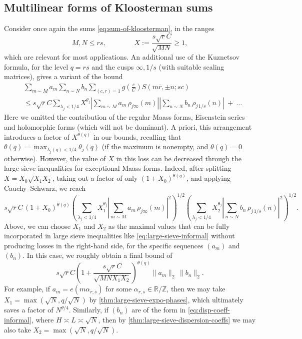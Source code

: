 \documentclass[reqno,11pt]{amsart}
\theoremstyle{remark}
\numberwithin{equation}{section}
\newcommand{\Z}{\mathbb{Z}}
\newcommand{\R}{\mathbb{R}}
\renewcommand{\bar}{\overline}
\begin{document}
\subsection{Multilinear forms of Kloosterman sums} \label{subsec:overview-kloosterman}
Consider once again the sums \cref{eq:sum-of-kloosterman}, in the ranges
\[
    M, N \le rs, \qquad\qquad 
    X := \frac{s\sqrt{r} C}{\sqrt{MN}} \ge 1,
\] 
which are relevant for most applications.
An additional use of the Kuznetsov formula, for the level $q = rs$ and the cusps $\infty, 1/s$ (with suitable scaling matrices), gives a variant of the bound
\[
\begin{aligned}
    &\sum_{m \sim M} a_m \sum_{n \sim N} b_n \sum_{(c, r) = 1} g\left(\frac{c}{C}\right) S(m\bar{r}, \pm n; sc)
    \\ 
    &\le 
    s\sqrt{r}C \sum_{\lambda_j < 1/4} X^{\theta_j} \left\vert \sum_{m \sim M} a_m\, \rho_{j\infty}(m) \right\vert \left\vert \sum_{n \sim N} b_n\, \rho_{j\, 1/s}(n)\right\vert \ + \ \ldots
\end{aligned}
\]
Here we omitted the contribution of the regular Maass forms, Eisenstein series and holomorphic forms (which will not be dominant).
A priori, this arrangement introduces a factor of $X^{\theta(q)}$ in our bounds, recalling that $\theta(q) = \max_{\lambda_j(q) < 1/4} \theta_j(q)$ (if the maximum is nonempty, and $\theta(q) = 0$ otherwise). However, the value of $X$ in this loss can be decreased through the large sieve inequalities for exceptional Maass forms. Indeed, after splitting $X = X_0 \sqrt{X_1 X_2}$, taking out a factor of only $(1 + X_0)^{\theta(q)}$, and applying Cauchy--Schwarz, we reach
\[
    s\sqrt{r}C\, (1 + X_0)^{\theta(q)} 
    \left(\sum_{\lambda_j < 1/4} X_1^{\theta_j} \left\vert \sum_{m \sim M} a_m\, \rho_{j\infty}(m) \right\vert^2 \right)^{1/2}
    \left(\sum_{\lambda_j < 1/4} X_2^{\theta_j} \left\vert \sum_{n \sim N} b_n\, \rho_{j\, 1/s}(n) \right\vert^2 \right)^{1/2}.
\]
Above, we can choose $X_1$ and $X_2$ as the maximal values that can be fully incorporated in large sieve inequalities like \cref{eq:large-sieve-informal} without producing losses in the right-hand side, for the specific sequences $(a_m)$ and $(b_n)$. In this case, we roughly obtain a final bound of
\[
    s\sqrt{r} C \left(1 + \frac{s\sqrt{r}C}{\sqrt{MN X_1 X_2}}\right)^{\theta(q)} 
    \|a_m\|_2\, \|b_n\|_2.
\]
For example, if $a_m = e(m\alpha_{r,s})$ for some $\alpha_{r,s} \in \R/\Z$, then we may take $X_1 = \max(\sqrt{N}, q/\sqrt{N})$ by \cref{thm:large-sieve-expo-phases}, which ultimately saves a factor of $N^{\theta/4}$. Similarly, if $(b_n)$ are of the form in \cref{eq:disp-coeff-informal}, where $H \asymp L \asymp \sqrt{N}$, then by \cref{thm:large-sieve-dispersion-coeffs} we may also take $X_2 = \max(\sqrt{N}, q/\sqrt{N})$. 
\end{document}
